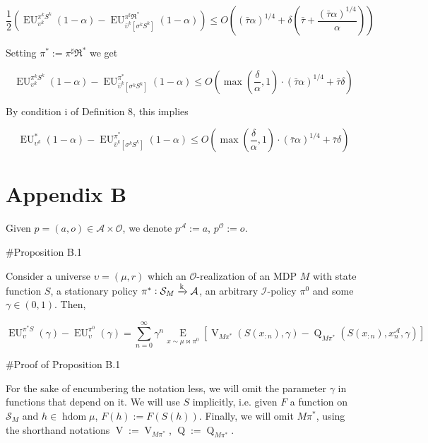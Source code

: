 \documentclass[a4paper]{article}
\newcommand{\Comment}[1]{}
\newcommand{\AP}[1]{\left(#1\right)}
\newcommand{\AB}[1]{\left[#1\right]}
\newcommand{\Ea}[2]{\underset{#1}{\operatorname{E}}\AB{#2}}
\newcommand{\M}{\xrightarrow{\textnormal{k}}}
\newcommand{\Ob}{\mathcal{O}}
\newcommand{\A}{\mathcal{A}}
\newcommand{\St}{\mathcal{S}}
\newcommand{\In}{\mathcal{I}}
\DeclareMathOperator{\HD}{hdom}
\newcommand{\V}{\operatorname{V}}
\newcommand{\Q}{\operatorname{Q}}
\newcommand{\EU}{\operatorname{EU}}
\begin{document}
$$\frac{1}{2}\AP{\EU_{\upsilon^k}^{\pi^k S^{k}}(1-\alpha)-\EU_{\bar{\upsilon}^k\AB{\sigma^k S^k}}^{\pi^\sharp\Re^*}(1-\alpha)} \leq O\AP{(\bar{\tau}\alpha)^{1/4} + \delta\AP{\bar{\tau}+\frac{(\bar{\tau} \alpha)^{1/4}}{\alpha}}}$$

\Comment{Given $h = a_0 b_0 o_0 a_1 b_1 o_1 \ldots a_{n-1} b_{n-1} o_{n-1} \in \overline{\A \times \Ob}^n$, we use the notation 

$$\bar{\Re}^*h := a_0 b_0 o_0 \Re a_1 b_1 o_1 \Re \ldots a_{n-1} b_{n-1} o_{n-1} \Re \in \overline{\A \times \Ob'}^n$$

We define $\pi^*$ as by $\pi^*(h) := \pi^\star\AP{\bar{\Re}^*h}$.}

Setting $\pi^* := \pi^\sharp \Re^*$ we get

$$\EU_{\upsilon^k}^{\pi^k S^{k}}(1-\alpha)-\EU_{\bar{\upsilon}^k\AB{\sigma^k S^{k}}}^{\pi^*}(1-\alpha) \leq O\AP{\max\AP{\frac{\delta}{\alpha},1}\cdot(\bar{\tau} \alpha)^{1/4}+\bar{\tau}\delta}$$

By condition i of Definition 8, this implies

$$\EU_{\upsilon^k}^{*}(1-\alpha)-\EU_{\bar{\upsilon}^k\AB{\sigma^k S^{k}}}^{\pi^*}(1-\alpha) \leq O\AP{\max\AP{\frac{\delta}{\alpha},1}\cdot(\bar{\tau} \alpha)^{1/4}+\bar{\tau}\delta}$$

\section{Appendix B}

Given $p=(a,o)\in\A\times\Ob$, we denote $p^\A:=a$, $p^\Ob:=o$.

\#Proposition B.1

Consider a universe $\upsilon=(\mu,r)$ which an $\Ob$-realization of an MDP $M$ with state function $S$, a stationary policy $\pi^*: \St_M \M \A$, an arbitrary $\In$-policy $\pi^0$ and some $\gamma \in (0,1)$. Then,

$$\EU_{\upsilon}^{\pi^* S}(\gamma) - \EU_{\upsilon}^{\pi^0}(\gamma)=\sum_{n=0}^\infty {\gamma^n \Ea{x\sim\mu\bowtie\pi^0}{\V_{M\pi^*}\AP{S\AP{x_{:n}},\gamma}-\Q_{M\pi^*}\AP{S\AP{x_{:n}},x_n^\A,\gamma}}}$$

\#Proof of Proposition B.1

For the sake of encumbering the notation less, we will omit the parameter $\gamma$ in functions that depend on it. We will use $S$ implicitly, i.e. given $F$ a function on $\St_M$ and $h \in \HD{\mu}$, $F(h):=F\AP{S(h)}$. Finally, we will omit $M\pi^*$, using the shorthand notations $\V:=\V_{M\pi^*}$, $\Q:=\Q_{M\pi^*}$.
\end{document}
